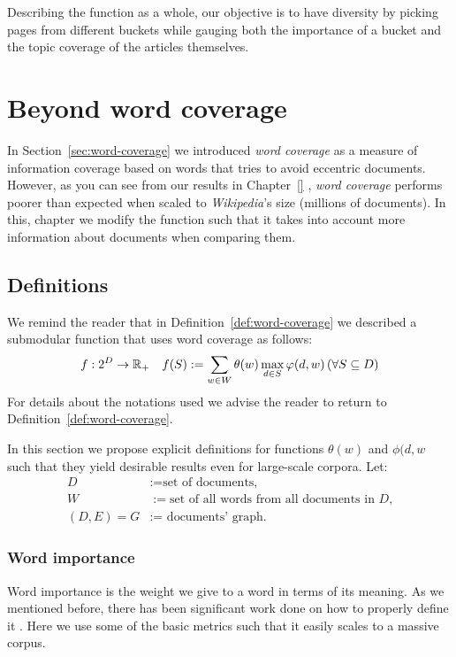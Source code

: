 Describing the function as a whole, our objective is to have diversity by
picking pages from different buckets while gauging both the importance of a
bucket and the topic coverage of the articles themselves.

\section{Beyond word coverage}
\label{sec:word-coverage++}

In Section~\vref{sec:word-coverage} we introduced \emph{word coverage} as a
measure of information coverage based on words that tries to avoid eccentric
documents.
However, as you can see from our results in Chapter~\vref{} , \emph{word coverage} performs poorer than expected when scaled to
\emph{Wikipedia}'s size (millions of documents).
In this, chapter we modify the function such that it takes into account more
information about documents when comparing them.

\subsection{Definitions}

We remind the reader that in Definition~\vref{def:word-coverage} we described a
submodular function that uses word coverage as follows:
\begin{align*}
  &f : 2^D \to \mathbb{R}_+
  &f(S) := \sum_{w \in W} \theta(w) \max_{d \in S} \varphi(d, w)
  \,(\forall S \subseteq D)
\end{align*}
For details about the notations used we advise the reader to return to
Definition~\vref{def:word-coverage}.

In this section we propose explicit definitions for functions \(\theta(w)\) and
\(\phi(d, w\) such that they yield desirable results even for large-scale
corpora.
Let:
\begin{align*}
  D &:= \text{set of documents,} \\
  W &:= \text{set of all words from all documents in \(D\),} \\
  (D, E) = G &:= \text{ documents' graph.}
\end{align*}

\subsubsection{Word importance}

Word importance is the weight we give to a word in terms of its meaning. As we
mentioned before, there has been significant work done on how to properly
define it \cite{}. Here we use some of the basic metrics
such that it easily scales to a massive corpus.

